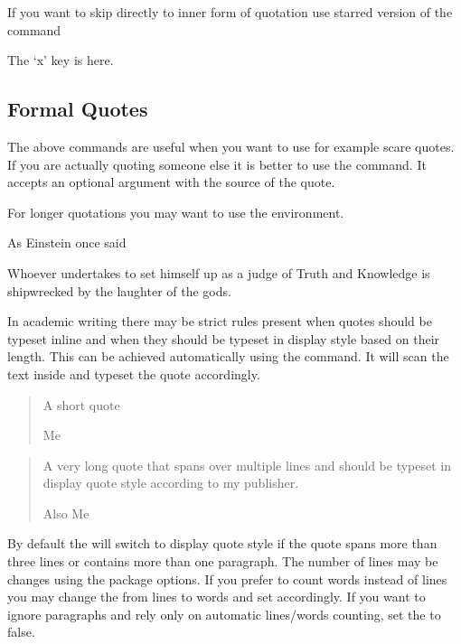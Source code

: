 If you want to skip directly to inner form of quotation use starred version of
the command
\begin{example}
The \enquote*{x} key is here.
\end{example}

\subsection{Formal Quotes}

The above commands are useful when you want to use for example scare quotes. If
you are actually quoting someone else it is better to use the 
command. It accepts an optional argument with the source of the quote.
\begin{example}
\end{example}

For longer quotations you may want to use the  environment.
\begin{example}
As Einstein once said
\begin{displayquote}[A.~Einstein]
  Whoever undertakes to
  set himself up as a judge
  of Truth and Knowledge is
  shipwrecked by the laughter
  of the gods.
\end{displayquote}
\end{example}

In academic writing there may be strict rules present when quotes should be
typeset inline and when they should be typeset in display style based on their
length. This can be achieved automatically using the  command.
It will scan the text inside and typeset the quote accordingly.
\begin{example}[examplewidth=0.4\textwidth]
\csdisplaytrue%
\blockquote[Me]{A short quote}

\blockquote[Also Me]{A very long
  quote that spans over multiple
  lines and should be typeset in
  display quote style
  according to my publisher.}
\end{example}
By default the  will switch to display quote style if the quote
spans more than three lines or contains more than one paragraph. The number of
lines may be changes using the  package options. If you prefer
to count words instead of lines you may change the  from
lines to words and set  accordingly. If you want to ignore
paragraphs and rely only on automatic lines\slash{}words counting, set the
 to false.

